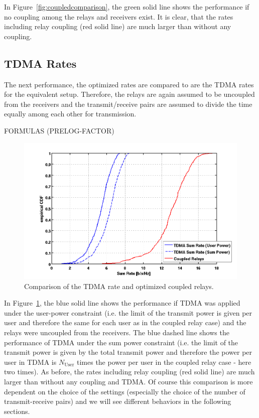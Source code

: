 In Figure~\ref{fig:coupledcomparison}, the green solid line shows the performance if no coupling among the relays and receivers exist.
It is clear, that the rates including relay coupling (red solid line) are much larger than without any coupling.

\subsection{TDMA Rates}
The next performance, the optimized rates are compared to are the TDMA rates for the equivalent setup.
Therefore, the relays are again assumed to be uncoupled from the receivers and the transmit/receive pairs are assumed to divide the time equally among each other for transmission.

FORMULAS (PRELOG-FACTOR)

\begin{figure}[h]
\centering
  \includegraphics[width=0.7\linewidth]{images/TDMAcomparison.png}
\caption{Comparison of the TDMA rate and optimized coupled relays.}
\label{fig:TDMAcomparison}
\end{figure}

In Figure~\ref{fig:TDMAcomparison}, the blue solid line shows the performance if TDMA was applied under the user-power constraint (i.e. the limit of the transmit power is given per user and therefore the same for each user as in the coupled relay case) and the relays were uncoupled from the receivers.
The blue dashed line shows the performance of TDMA under the sum power constraint (i.e. the limit of the transmit power is given by the total transmit power and therefore the power per user in TDMA is $N_\text{User}$ times the power per user in the coupled relay case - here two times).
As before, the rates including relay coupling (red solid line) are much larger than without any coupling and TDMA.
Of course this comparison is more dependent on the choice of the settings (especially the choice of the number of transmit-receive pairs) and we will see different behaviors in the following sections. 

